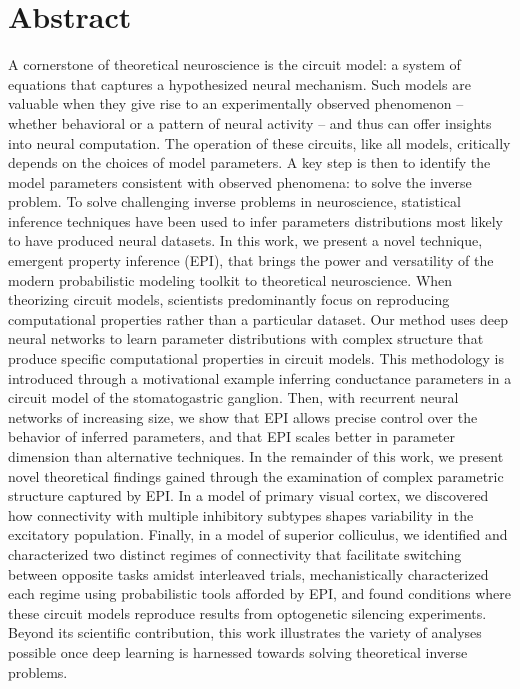 \documentclass[11pt]{article}
\begin{document}
\section{Abstract}
A cornerstone of theoretical neuroscience is the circuit model: a system of equations that captures a hypothesized neural mechanism.  
Such models are valuable when they give rise to an experimentally observed phenomenon -- whether behavioral or a pattern of neural activity -- and thus can offer insights into neural computation.
The operation of these circuits, like all models, critically depends on the choices of model parameters.
A key step is then to identify the model parameters consistent with observed phenomena: to solve the inverse problem.
To solve challenging inverse problems in neuroscience, statistical inference techniques have been used to infer parameters distributions most likely to have produced neural datasets.
In this work, we present a novel technique, emergent property inference (EPI), that brings the power and versatility of the modern probabilistic modeling toolkit to theoretical neuroscience.
When theorizing circuit models, scientists predominantly focus on reproducing computational properties rather than a particular dataset.
Our method uses deep neural networks to learn parameter distributions with complex structure that produce specific computational properties in circuit models.
This methodology is introduced through a motivational example inferring conductance parameters in a circuit model of the stomatogastric ganglion.
Then, with recurrent neural networks of increasing size, we show that EPI allows precise control over the behavior of inferred parameters, and that EPI scales better in parameter dimension than alternative techniques.
In the remainder of this work, we present novel theoretical findings gained through the examination of complex parametric structure captured by EPI.
In a model of primary visual cortex, we discovered how connectivity with multiple inhibitory subtypes shapes variability in the excitatory population.
Finally, in a model of superior colliculus, we identified and characterized two distinct regimes of connectivity that facilitate switching between opposite tasks amidst interleaved trials, mechanistically characterized each regime using probabilistic tools afforded by EPI, and found conditions where these circuit models reproduce results from optogenetic silencing experiments.
Beyond its scientific contribution, this work illustrates the variety of analyses possible once deep learning is harnessed towards solving theoretical inverse problems.
\end{document}
